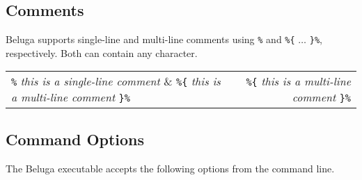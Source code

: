 \documentclass[11pt]{article}
\begin{document}
\subsection{Comments}

Beluga supports single-line and multi-line comments using \verb+%+ and \verb+%{+ $\ldots$ \verb+}%+, respectively.
Both can contain any character.

\begin{center}
\begin{tabular}{ | l | r }
  \verb+%+ \textit{this is a single-line comment} &  \verb+%{+ \textit{this is a multi-line comment}  \verb+}%+ \\
\end{tabular}
\end{center}


\subsection{Command Options}
The Beluga executable accepts the following options from the command line.\\
\end{document}
